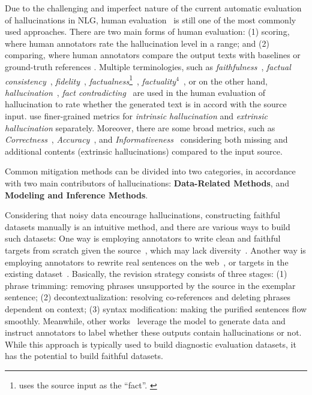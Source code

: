 \label{subsec:human_evaluation}
Due to the challenging and imperfect nature of the current automatic evaluation of hallucinations in NLG, human evaluation~ is still one of the most commonly used approaches. 
There are two main forms of human evaluation: (1) scoring, where human annotators rate the hallucination level in a range; 
and (2) comparing, where human annotators compare the output texts with baselines or ground-truth references .
Multiple terminologies, such as
 \textit{faithfulness}~, 
 \textit{factual consistency}~, \textit{fidelity}~, 
 \textit{factualness}\footnote{uses the source input as the “fact”. \label{fact}}~, 
 \textit{factuality}$^4$~,
 or on the other hand, \textit{hallucination}~, 
 \textit{fact contradicting}~
  are used in the human evaluation of hallucination to rate whether the generated text is in accord with the source input.
  use finer-grained metrics for \textit{intrinsic hallucination} and \textit{extrinsic hallucination} separately. 
Moreover, there are some broad metrics, such as \textit{Correctness}~,
\textit{Accuracy}~,
and \textit{Informativeness}~ 
considering both missing and additional contents (extrinsic hallucinations) compared to the input source.

\label{section:mitigation}
Common mitigation methods can be divided into two categories, in accordance with two main contributors of hallucinations: \textbf{Data-Related Methods}, and \textbf{Modeling and Inference Methods}.



Considering that noisy data encourage hallucinations, constructing faithful datasets manually is an intuitive method, and there are various ways to build such datasets:
One way is employing annotators to write clean and faithful targets from scratch given the source~, which may lack diversity~.
Another way is employing annotators to rewrite real sentences on the web~, 
or targets in the existing dataset~. 
Basically, the revision strategy consists of three stages: 
(1) phrase trimming: removing phrases unsupported by the source in the exemplar sentence;
(2) decontextualization: resolving co-references and deleting phrases dependent on context;
(3) syntax modification: making the purified sentences flow smoothly.
Meanwhile, other works~ leverage the model to generate data and instruct annotators to label whether these outputs contain hallucinations or not. 
While this approach is typically used to build diagnostic evaluation datasets, it has the potential to build faithful datasets.

